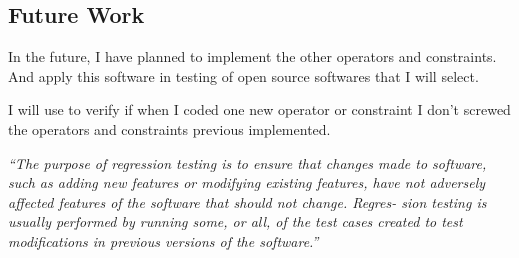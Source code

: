 \clearpage
\subsection{Future Work}

In the future, I have planned to implement the other operators and constraints. And apply this software in testing of open source softwares that I will select.

I will use  to verify if when I coded one new operator or constraint I don't screwed the operators and constraints previous implemented.


\textit{``The purpose of regression testing is to ensure that changes made to software, such as adding new features or modifying existing features, have not adversely affected features of the software that should not change. Regres- sion testing is usually performed by running some, or all, of the test cases created to test modifications in previous versions of the software.''}



